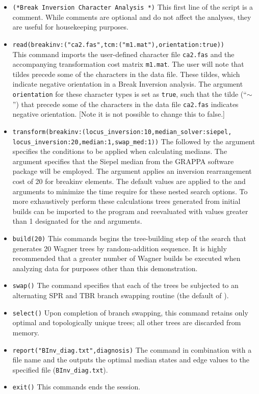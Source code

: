 \begin{itemize}
\item \texttt{(*Break Inversion Character Analysis *)} This first
line of the script is a comment. While comments are optional and
do not affect the analyses, they are useful for housekeeping purposes.
\item \texttt{read(breakinv:("ca2.fas",tcm:("m1.mat"),orientation:true))}\\ 
This command imports the user-defined 
character file \texttt{ca2.fas} and the accompanying transformation
cost matrix \texttt{m1.mat}.  The user will note that tildes precede
some of the characters in the data file.  These tildes, which
indicate negative orientation in a Break Inversion analysis. The
argument \texttt{orientation} for these character types is set as
\texttt{true}, such that the tilde (``$\sim$'') that precede some
of the characters in the data file \texttt{ca2.fas} indicates
negative orientation. [Note it is not possible to change this to false.]  
\item \texttt{transform(breakinv:(locus\_inversion:10,median\_solver:siepel,\\
locus\_inversion:20,median:1,swap\_med:1))}
The  followed by the argument 
specifies the conditions to be applied when calculating medians.
The argument  specifies that
the Siepel median from the GRAPPA software package \cite{baderetal2002}
will be employed.  The argument 
applies an inversion rearrangement cost of 20 for \poyargument
{breakinv} elements. The default values are applied to the
 and  arguments to
minimize the time require for these nested search options.   To
more exhaustively perform these calculations trees generated from
initial builds can be imported to the program and reevaluated with
values greater than 1 designated for the  and
 arguments.  
\item \texttt{build(20)} This commands begins the tree-building step
of the search that generates 20 Wagner trees by  random-addition sequence.  
It is highly recommended that a greater number of Wagner builds be 
executed when analyzing data for  purposes other than this demonstration.
\item \texttt{swap()} The  command specifies that
each of the trees be subjected to an alternating SPR and TBR branch
swapping routine (the default of \poy).  
\item \texttt{select()} Upon completion of branch swapping, this 
command retains only optimal and topologically unique trees; 
all other trees are discarded from memory.  
\item \texttt{report("BInv\_diag.txt",diagnosis)}  The
 command in combination with a file name and the
 outputs the optimal median states and edge
values to the specified file (\texttt{BInv\_diag.txt}).  
\item \texttt{exit()} This commands ends the \poy session.
\end{itemize}

